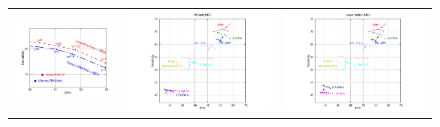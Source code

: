 \iffalse
\begin{figure}[t]
\center
\begin{tabular}{ccc}
\hspace{-0.5cm}\includegraphics[scale=.8]{figs/new_MEA_diff_gamma_beam_inf_threshold_001}
&
\hspace{-1.85cm}\includegraphics[scale=.58]{figs/new_MEA_RNAfold_diff_gamma_families}
&
\hspace{-2.35cm}\includegraphics[scale=.58]{figs/new_MEA_LinearPartition_diff_gamma_families}


\end{tabular}
\end{figure}
